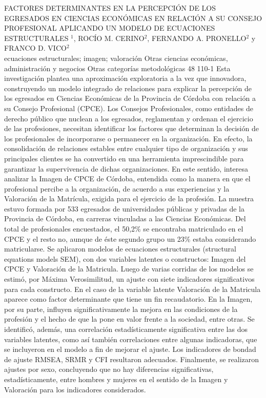 \A
{FACTORES DETERMINANTES EN LA PERCEPCIÓN DE LOS EGRESADOS EN CIENCIAS ECONÓMICAS EN RELACIÓN A SU CONSEJO PROFESIONAL APLICANDO UN MODELO DE ECUACIONES ESTRUCTURALES}
{$^1$, ROCÍO M. CERINO$^2$, FERNANDO A. PRONELLO$^2$ y FRANCO D. VICO$^2$}
{
\\}
{ecuaciones estructurales; imagen; valoración} 
 {Otras ciencias económicas, administración y negocios} 
 {Otras categorías metodológicas} 
 {48} 
 {110-1}
{Esta investigación plantea una aproximación exploratoria a la vez que innovadora, construyendo un modelo integrado de relaciones para explicar la percepción de los egresados en Ciencias Económicas de la Provincia de Córdoba con relación a su Consejo Profesional (CPCE). Los Consejos Profesionales, como entidades de derecho público que nuclean a los egresados, reglamentan y ordenan el ejercicio de las profesiones, necesitan identificar los factores que determinan la decisión de los profesionales de incorporarse o permanecer en la organización. En efecto, la consolidación de relaciones estables entre cualquier tipo de organización y sus principales clientes se ha convertido en una herramienta imprescindible para garantizar la supervivencia de dichas organizaciones. En este sentido, interesa analizar la Imagen de CPCE de Córdoba, entendida como la manera en que el profesional percibe a la organización, de acuerdo a sus experiencias y la Valoración de la Matrícula, exigida para el ejercicio de la profesión. La muestra estuvo formada por 533 egresados de universidades públicas y privadas de la Provincia de Córdoba, en carreras vinculadas a las Ciencias Económicas. Del total de profesionales encuestados, el 50,2\% se encontraba matriculado en el CPCE y el resto no, aunque de éste segundo grupo un 23\% estaba considerando matricularse. Se aplicaron modelos de ecuaciones estructurales (structural equations models SEM), con dos variables latentes o constructos: Imagen del CPCE y Valoración de la Matricula. Luego de varias corridas de los modelos se estimó, por Máxima Verosimilitud, un ajuste con siete indicadores significativos para cada constructo. En el caso de la variable latente Valoración de la Matricula aparece como factor determinante que tiene un fin recaudatorio. En la Imagen, por su parte, influyen significativamente la mejora en las condiciones de la profesión y el hecho de que la pone en valor frente a la sociedad, entre otras. Se identificó, además, una correlación estadísticamente significativa entre las dos variables latentes, como así también correlaciones entre algunas indicadoras, que se incluyeron en el modelo a fin de mejorar el ajuste. Los indicadores de bondad de ajuste RMSEA, SRMR y CFI resultaron adecuados. Finalmente, se realizaron ajustes por sexo, concluyendo que no hay diferencias significativas, estadísticamente, entre hombres y mujeres en el sentido de la Imagen y Valoración para los indicadores considerados. }
